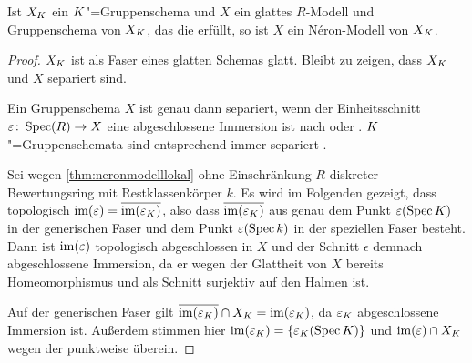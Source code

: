 \begin{Lemma}\label{nerongruppenschemaglatt}
  Ist $X_{K}$ ein $K$"=Gruppenschema und $X$ ein
  glattes $R$-Modell und Gruppenschema von $X_{K}$, das die
  \NAbbEig erfüllt, so ist $X$ ein Néron-Modell von $X_{K}$.
  \begin{proof}
    $X_{K}$ ist als Faser eines glatten Schemas glatt. Bleibt zu
    zeigen, dass $X_{K}$ und $X$ separiert sind.
    
    Ein Gruppenschema $X$ ist genau dann separiert, wenn der
    Einheitsschnitt ${\varepsilon\colon\operatorname{Spec}(R)\to X}$ eine abgeschlossene
    Immersion ist nach
    \cite[Lemma 38.6.1]{stacksproject} oder \cite[7.1, Lemma 2]{neron}.
    $K$"=Gruppenschemata sind entsprechend immer separiert
    \cite[Lemma 38.7.3]{stacksproject}. 

    Sei wegen \ref{thm:neronmodelllokal} ohne Einschränkung $R$ diskreter
    Bewertungsring mit Restklassenkörper $k$.    
    Es wird im Folgenden gezeigt, dass topologisch
    $\operatorname{im}(\varepsilon)=\overline{\operatorname{im}(\varepsilon_{K})}$,
    also dass $\overline{\operatorname{im}(\varepsilon_{K})}$ aus genau dem Punkt
    $\varepsilon(\operatorname{Spec}K)$ in der generischen Faser und dem Punkt
    $\varepsilon(\operatorname{Spec} k)$ in der speziellen Faser besteht.
    Dann ist $\operatorname{im}(\varepsilon)$ topologisch abgeschlossen in $X$ und der
    Schnitt $\epsilon$ demnach abgeschlossene Immersion, da er
    wegen der Glattheit von $X$ bereits Homeomorphismus und als
    Schnitt surjektiv auf den Halmen ist.
    
    Auf der generischen Faser gilt
    $\overline{\operatorname{im}(\varepsilon_{K})}\cap X_{K}=\operatorname{im}(\varepsilon_{K})$,
    da $\varepsilon_{K}$ abgeschlossene Immersion ist.
    Außerdem stimmen hier $\operatorname{im}(\varepsilon_{K})=\{\varepsilon_{K}(\operatorname{Spec}K)\}$
    und $\operatorname{im}(\varepsilon)\cap X_{K}$ wegen der \NAbbEig punktweise
    überein.


\end{proof}
\end{Lemma}
